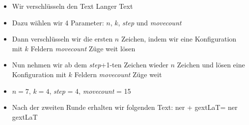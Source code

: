 \begin{frame}
        \begin{itemize}
            \item Wir verschlüsseln den Text \glqq Langer Text\grqq
            \item Dazu wählen wir 4 Parameter: $n$, $k$, \textit{step} und \textit{movecount}
            \item Dann verschlüsseln wir die ersten $n$ Zeichen, indem wir eine Konfiguration mit $k$ Feldern \textit{movecount} Züge weit lösen
            \item Nun nehmen wir ab dem \textit{step}+1-ten Zeichen wieder $n$ Zeichen und lösen eine Konfiguration mit $k$ Feldern \textit{movecount} Züge weit
        \end{itemize}
    \begin{myexample}
        \begin{itemize}
            \item $n=7$, $k=4$, \textit{step} = 4, \textit{movecount} = 15
            \item Nach der zweiten Runde erhalten wir folgenden Text: \glqq ner \grqq + \glqq gextLaT\grqq = \glqq ner gextLaT\grqq
        \end{itemize}
    \end{myexample}
\end{frame}